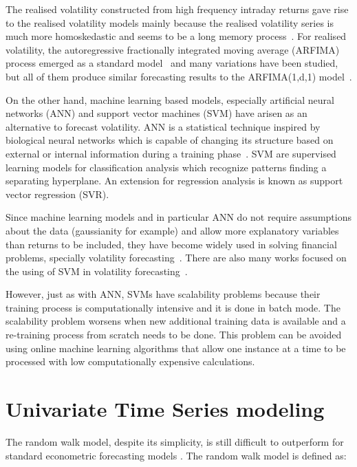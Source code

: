 The realised volatility constructed from high frequency intraday returns gave
rise to the realised volatility models mainly because the realised volatility
series is much more homoskedastic and seems to be a long memory
process~\cite{andersonetal2003}. For realised volatility, the autoregressive
fractionally integrated moving average (ARFIMA) process emerged as a standard
model~\cite{chenetal2010} and many variations have been studied, but all of
them produce similar forecasting results to the ARFIMA(1,d,1)
model~\cite{koopmanetal2005}.  

On the other hand, machine learning based models, especially artificial neural
networks (ANN) and support vector machines (SVM) have arisen as an alternative
to forecast volatility. ANN is a statistical technique inspired by biological
neural networks which is capable of changing its structure based on external or
internal information during a training phase~\cite{sammut2011}. SVM are
supervised learning models for classification analysis which recognize patterns
finding a separating hyperplane. An extension for regression analysis is known
as support vector regression (SVR). 

Since machine learning models and in particular ANN do not require assumptions
about the data (gaussianity for example) and allow more explanatory variables
than returns to be included, they have become widely used in solving financial
problems, specially volatility
forecasting~\cite{hamidetal2004,donaldsonetal1997}. There are also many works
focused on the using of SVM in volatility
forecasting~\cite{shiyietal2008,shiyietal2010,gavrishchaka2006,vasilios2012}. 

However, just as with ANN, SVMs have scalability problems because their
training process is computationally intensive and it is done in batch mode. The
scalability problem worsens when new additional training data is available and
a re-training process from scratch needs to be done. This problem can be
avoided using online machine learning algorithms that allow one instance at a
time to be processed with low computationally expensive calculations.

\section{Univariate Time Series modeling}

The random walk model, despite its simplicity, is still difficult to outperform
for standard econometric forecasting models \cite{lo2011}. The random walk model
is defined as:

